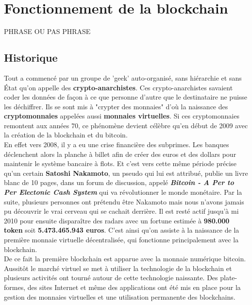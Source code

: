 \documentclass[12pt]{report}
\begin{document}
\newpage
\section{Fonctionnement de la blockchain}

\hspace{1cm}  PHRASE OU PAS PHRASE


	\subsection{Historique}
\hspace{1cm} Tout a commencé par un groupe de 'geek' auto-organisé, sans hiérarchie et sans État qu'on appelle des \textbf{crypto-anarchistes}. Ces crypto-anarchistes savaient coder les données de façon à ce que personne d'autre que le destinataire ne puisse les déchiffrer. Ils se sont mis à "crypter des monnaies" d'où la naissance des \textbf{cryptomonnaies} appelées aussi \textbf{ monnaies virtuelles}. Si ces cryptomonnaies remontent aux années 70, ce phénomène devient célèbre qu'en début de 2009 avec la création de la blockchain et du bitcoin.\\

\hspace{1cm} En effet vers 2008, il y a eu une crise financière des subprimes. Les banques déclenchent alors la planche à billet afin de créer des euros et des dollars pour maintenir le système bancaire à flots. Et c'est vers cette même période précise qu'un certain \textbf{Satoshi Nakamoto}, un pseudo qui lui est attribué, publie un livre blanc de 10 pages, dans un forum de discussion, appelé \textbf{\textit{Bitcoin - A Per to Per Electonic Cash System }} qui va révolutionner le monde monétaire. Par la suite, plusieurs personnes ont prétendu être Nakamoto mais nous n'avons jamais pu découvrir le vrai cerveau qui se cachait derrière. Il est resté actif jusqu'à mi 2010 pour ensuite disparaître des radars avec un fortune estimée à \textbf{980.000 token} soit \textbf{5.473.465.943 euros}. C'est ainsi qu'on assiste à la naissance  de la première monnaie virtuelle décentralisée, qui fonctionne principalement avec la blockchain. \\ 

\hspace{1cm} De ce fait la première blockchain est apparue avec la monnaie numérique bitcoin. Aussitôt le marché virtuel se met à utiliser la technologie de la blockchain et plusieurs activités ont tourné autour de cette technologie naissante. Des plate-formes, des sites Internet et même des applications ont été mis en place pour la gestion des monnaies virtuelles et une utilisation permanente des blockchains.
\end{document}

